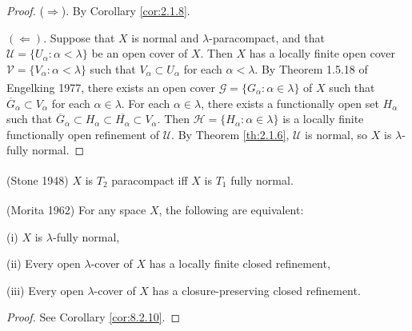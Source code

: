 \documentclass[ch2.tex]{subfiles}
\begin{document}
\begin{proof}
($\Rightarrow$). By Corollary \ref{cor:2.1.8}.
	
$(\Leftarrow)$. Suppose that $X$ is normal and $\lambda$-paracompact, and 
that $\mathscr{U} = \{U_\alpha: \alpha < \lambda\}$ be an open cover of $X$.
Then $X$ has a locally finite open cover $\mathscr{V} = \{V_\alpha: \alpha < \lambda\}$ 
such that $V_\alpha \subset U_\alpha$ for each $\alpha < \lambda$. 
By Theorem 1.5.18 of \hstretch{1.8}{[}Engelking 1977\hstretch{1.8}{]}\textsuperscript{\cite{Engelking}}, 
there exists an open cover $\mathscr{G} = \{G_\alpha: \alpha \in \lambda\}$ of $X$ 
such that $\overline{G}_\alpha \subset V_\alpha$ for each $\alpha \in \lambda$. 
For each $\alpha \in \lambda$, there exists a functionally open set $H_\alpha$ such that $\overline{G}_\alpha \subset H_\alpha \subset \overline{H_\alpha}\subset V_\alpha$. 
Then $\mathscr{H} = \{H_\alpha: \alpha \in \lambda\}$ is a locally finite
 functionally open refinement of $\mathscr{U}$. 
 By Theorem \ref{th:2.1.6}, 
 $\mathscr{U}$ is  normal, so $X$ is $\lambda$-fully normal.
\end{proof}

{\theorem{}  \label{th:2.2.4}
\textup{(\hstretch{1.8}{[}Stone 1948\hstretch{1.8}{]}\textsuperscript{\cite{Stone}})}
	$X$ is $T_2$ paracompact iff $X$ is $T_1$ fully normal.\hfill\qedsymbol
}

{\theorem{}  \label{th:2.2.5}
\textup{(\hstretch{1.8}{[}Morita 1962\hstretch{1.8}{]}\textsuperscript{\cite{Morita1962}})}
For any space $X$, the following are equivalent:

 \textup{(i)} $X$ is $\lambda$-fully normal,

 \textup{(ii)} Every open $\lambda$-cover of $X$ has a locally finite closed refinement,

 \textup{(iii)}  Every open $\lambda$-cover of $X$ has a closure-preserving closed refinement.
}


\begin{proof}
	See Corollary \ref{cor:8.2.10}.   %
\end{proof} 
\end{document}
